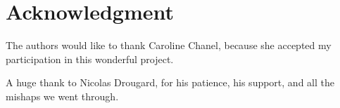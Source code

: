 \documentclass[conference]{IEEEtran}
\newlength\figureheight
\newlength\figurewidth
\newcommand*{\SET}[1]{\ensuremath{\boldsymbol{#1}}}
\begin{document}



%  


\section*{Acknowledgment}

The authors would like to thank Caroline Chanel, because she accepted my participation in this wonderful project.

A huge thank to Nicolas Drougard, for his patience, his support, and all the mishaps we went through.





\end{document}
